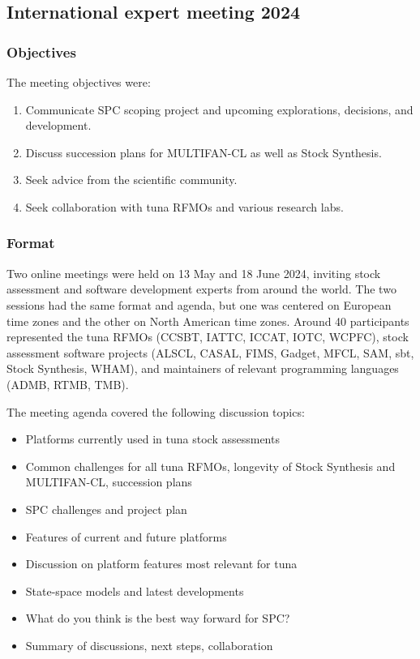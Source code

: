 \documentclass{SCreport}
\begin{document}
\subsection{International expert meeting 2024}

\subsubsection{Objectives}

The meeting objectives were:

\begin{enumerate}
  \item Communicate SPC scoping project and upcoming explorations, decisions,
  and development.
  \item Discuss succession plans for MULTIFAN-CL as well as Stock Synthesis.
  \item Seek advice from the scientific community.
  \item Seek collaboration with tuna RFMOs and various research labs.
\end{enumerate}

\subsubsection{Format}

Two online meetings were held on 13 May and 18 June 2024, inviting stock
assessment and software development experts from around the world. The two
sessions had the same format and agenda, but one was centered on European time
zones and the other on North American time zones. Around 40 participants
represented the tuna RFMOs (CCSBT, IATTC, ICCAT, IOTC, WCPFC), stock assessment
software projects (ALSCL, CASAL, FIMS, Gadget, MFCL, SAM, sbt, Stock Synthesis,
WHAM), and maintainers of relevant programming languages (ADMB, RTMB, TMB).

The meeting agenda covered the following discussion topics:

\begin{itemize}
  \item Platforms currently used in tuna stock assessments\\[-4ex]
  \item Common challenges for all tuna RFMOs, longevity of Stock Synthesis and
  MULTIFAN-CL, succession plans\\[-4ex]
  \item SPC challenges and project plan\\[-4ex]
  \item Features of current and future platforms\\[-4ex]
  \item Discussion on platform features most relevant for tuna\\[-4ex]
  \item State-space models and latest developments\\[-4ex]
  \item What do you think is the best way forward for SPC?\\[-4ex]
  \item Summary of discussions, next steps, collaboration
\end{itemize}
\end{document}
